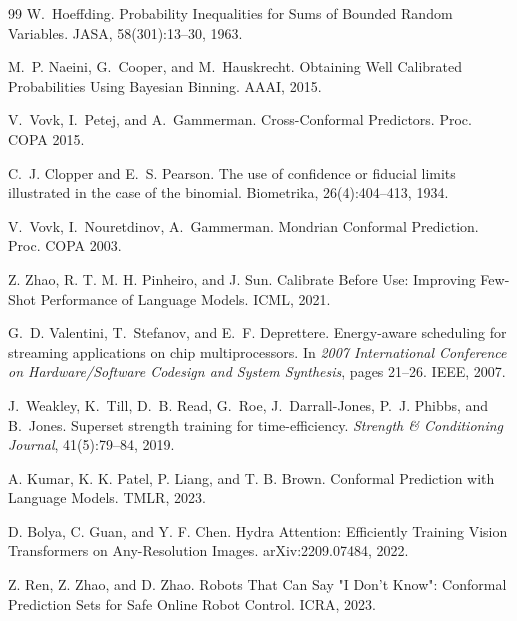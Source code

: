 \documentclass[11pt]{article}
\begin{document}
\begin{thebibliography}{99}
W.~Hoeffding.
\newblock Probability Inequalities for Sums of Bounded Random Variables.
\newblock JASA, 58(301):13--30, 1963.

M.~P. Naeini, G.~Cooper, and M.~Hauskrecht.
\newblock Obtaining Well Calibrated Probabilities Using Bayesian Binning.
\newblock AAAI, 2015.

V.~Vovk, I.~Petej, and A.~Gammerman.
\newblock Cross-Conformal Predictors.
\newblock Proc. COPA 2015.

C.~J. Clopper and E.~S. Pearson.
\newblock The use of confidence or fiducial limits illustrated in the case of the binomial.
\newblock Biometrika, 26(4):404--413, 1934.

V.~Vovk, I.~Nouretdinov, A.~Gammerman.
\newblock Mondrian Conformal Prediction.
\newblock Proc. COPA 2003.

Z. Zhao, R. T. M. H. Pinheiro, and J. Sun.
\newblock Calibrate Before Use: Improving Few-Shot Performance of Language Models.
\newblock ICML, 2021.

G.~D. Valentini, T.~Stefanov, and E.~F. Deprettere.
\newblock Energy-aware scheduling for streaming applications on chip multiprocessors.
\newblock In \emph{2007 International Conference on Hardware/Software Codesign and System Synthesis}, pages 21--26. IEEE, 2007.

J.~Weakley, K.~Till, D.~B. Read, G.~Roe, J.~Darrall-Jones, P.~J. Phibbs, and B.~Jones.
\newblock Superset strength training for time-efficiency.
\newblock \emph{Strength \& Conditioning Journal}, 41(5):79--84, 2019.

A. Kumar, K. K. Patel, P. Liang, and T. B. Brown.
\newblock Conformal Prediction with Language Models.
\newblock TMLR, 2023.

D. Bolya, C. Guan, and Y. F. Chen.
\newblock Hydra Attention: Efficiently Training Vision Transformers on Any-Resolution Images.
\newblock arXiv:2209.07484, 2022.

Z. Ren, Z. Zhao, and D. Zhao.
\newblock Robots That Can Say "I Don't Know": Conformal Prediction Sets for Safe Online Robot Control.
\newblock ICRA, 2023.

\end{thebibliography}
\end{document}
